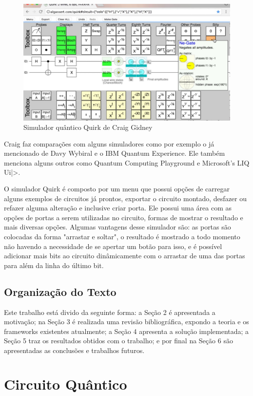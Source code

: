 \documentclass[a4paper, 12pt, oneside]{book}
\begin{document}
\begin{figure}[hbtp]
\centering
\includegraphics[scale=0.36]{quirk.jpg}
\caption{Simulador quântico Quirk de Craig Gidney}
\end{figure}

Craig faz comparações com alguns simuladores como por exemplo o já mencionado de Davy Wybiral e o IBM Quantum Experience. Ele também menciona alguns outros como Quantum Computing Playground e Microsoft's LIQ Ui|>.

O simulador Quirk é composto por um menu que possui opções de carregar alguns exemplos de circuitos já prontos, exportar o circuito montado, desfazer ou refazer alguma alteração e inclusive criar porta. Ele possui uma área com as opções de portas a serem utilizadas no circuito, formas de mostrar o resultado e mais diversas opções. Algumas vantagens desse simulador são: as portas são colocadas da forma "arrastar e soltar", o resultado é mostrado a todo momento não havendo a necessidade de se apertar um botão para isso, e é possível adicionar mais bits ao circuito dinâmicamente com o arrastar de uma das portas para além da linha do último bit.

\section{Organização do Texto}

Este trabalho está divido da seguinte forma: a Seção 2 é apresentada a motivação; na Seção 3 é realizada uma revisão bibliográfica, expondo a teoria e os frameworks existentes atualmente; a Seção 4 apresenta a solução implementada; a Seção 5 traz os resultados obtidos com o trabalho; e por final na Seção 6 são apresentadas as conclusões e trabalhos futuros.


\chapter{Circuito Quântico}
\end{document}
